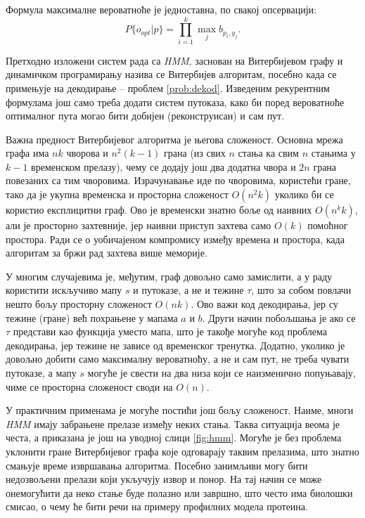 \documentclass[12pt,oneside]{memoir}
\begin{document}
\begin{CJK}{UTF8}{ipxm}
Формула максималне вероватноће је једноставна, по свакој опсервацији: $$P\{o_{opt} | p\} = \prod_{i=1}^k \max_j b_{p_i, y_j}.$$

Претходно изложени систем рада са \textit{HMM}, заснован на Витербијевом графу и динамичком програмирању назива се Витербијев алгоритам\cite{ba10c}, посебно када се примењује на декодирање -- проблем \ref{prob:dekod}. Изведеним рекурентним формулама још само треба додати систем путоказа, како би поред вероватноће оптималног пута могао бити добијен (реконструисан) и сам пут.

Важна предност Витербијевог алгоритма је његова сложеност. Основна мрежа графа има $nk$ чворова и $n^2 (k-1)$ грана (из свих $n$ стања ка свим $n$ стањима у $k-1$ временском прелазу), чему се додају још два додатна чвора и $2n$ грана повезаних са тим чворовима. Израчунавање иде по чворовима, користећи гране, тако да је укупна временска и просторна сложеност $O(n^2 k)$ уколико би се користио експлицитни граф. Ово је временски знатно боље од наивних $O(n^k k)$, али је просторно захтевније, јер наивни приступ захтева само $O(k)$ помоћног простора. Ради се о уобичајеном компромису између времена и простора, када алгоритам за бржи рад захтева више меморије.

У многим случајевима је, међутим, граф довољно само замислити, а у раду користити искључиво мапу $s$ и путоказе, а не и тежине $\tau$, што за собом повлачи нешто бољу просторну сложеност $O(nk)$. Ово важи код декодирања, јер су тежине (гране) већ похрањене у мапама $a$ и $b$. Други начин побољшања је ако се $\tau$ представи као функција уместо мапа, што је такође могуће код проблема декодирања, јер тежине не зависе од временског тренутка. Додатно, уколико је довољно добити само максималну вероватноћу, а не и сам пут, не треба чувати путоказе, а мапу $s$ могуће је свести на два низа који се наизменично попуњавају, чиме се просторна сложеност своди на $O(n)$.

У практичним применама је могуће постићи још бољу сложеност. Наиме, многи \textit{HMM} имају забрањене прелазе између неких стања. Таква ситуација веома је честа, а приказана је још на уводној слици \ref{fig:hmm}. Могуће је без проблема уклонити гране Витербијевог графа које одговарају таквим прелазима, што знатно смањује време извршавања алгоритма. Посебно занимљиви могу бити недозвољени прелази који укључују извор и понор. На тај начин се може онемогућити да неко стање буде полазно или завршно, што често има биолошки смисао, о чему ће бити речи на примеру профилних модела протеина.


\end{CJK}
\end{document}
